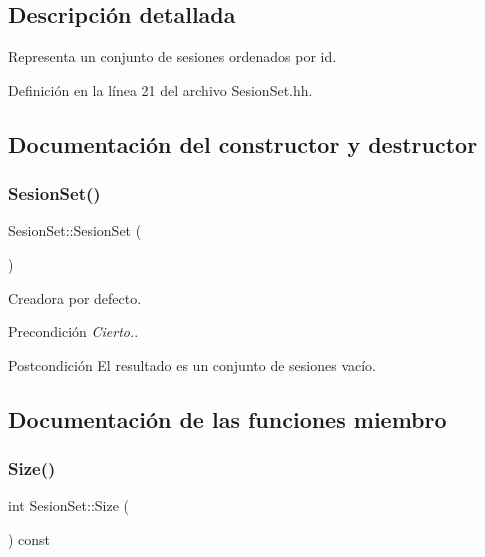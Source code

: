 \subsection{Descripción detallada}
Representa un conjunto de sesiones ordenados por id. 

Definición en la línea 21 del archivo Sesion\+Set.\+hh.



\subsection{Documentación del constructor y destructor}
\mbox{\label{class_sesion_set_af583057121150fb193e71ae02e036bb0}} 
\subsubsection{\texorpdfstring{Sesion\+Set()}{SesionSet()}}
{\footnotesize\ttfamily Sesion\+Set\+::\+Sesion\+Set (\begin{DoxyParamCaption}{ }\end{DoxyParamCaption})}



Creadora por defecto. 

\begin{DoxyPrecond}{Precondición}
{\itshape Cierto.}. 
\end{DoxyPrecond}
\begin{DoxyPostcond}{Postcondición}
El resultado es un conjunto de sesiones vacío. 
\end{DoxyPostcond}


\subsection{Documentación de las funciones miembro}
\mbox{\label{class_sesion_set_aa4cf0fbea2b9f9b6322390fc8b4a1b4c}} 
\subsubsection{\texorpdfstring{Size()}{Size()}}
{\footnotesize\ttfamily int Sesion\+Set\+::\+Size (\begin{DoxyParamCaption}{ }\end{DoxyParamCaption}) const}



